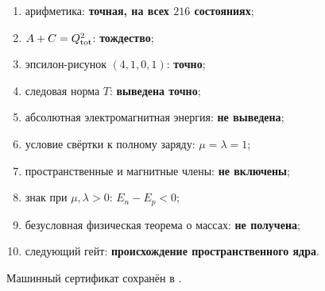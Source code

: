 \begin{protocol}
\begin{enumerate}
 \item арифметика: \textbf{точная, на всех $216$ состояниях};
 \item $A+C=Q_{\rm tot}^2$: \textbf{тождество};
 \item эпсилон-рисунок $(4,1,0,1)$: \textbf{точно};
 \item следовая норма $T$: \textbf{выведена точно};
 \item абсолютная электромагнитная энергия: \textbf{не выведена};
 \item условие свёртки к полному заряду: \textbf{$\mu=\lambda=1$};
 \item пространственные и магнитные члены: \textbf{не включены};
 \item знак при $\mu,\lambda>0$: \textbf{$E_n-E_p<0$};
 \item безусловная физическая теорема о массах: \textbf{не получена};
 \item следующий гейт: \textbf{происхождение пространственного ядра}.
\end{enumerate}
\end{protocol}

Машинный сертификат сохранён в
.